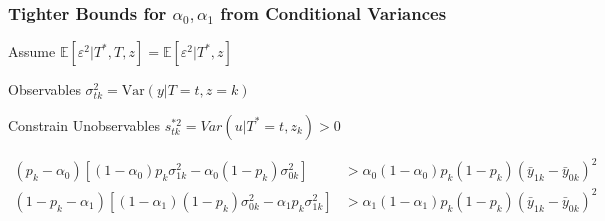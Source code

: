 \documentclass{beamer}
\begin{document}
\begin{frame}
  \frametitle{Tighter Bounds for $\alpha_0, \alpha_1$ from Conditional Variances}
  \begin{block}{Assume}
    $\mathbb{E}[\varepsilon^2|T^*,T,z] = \mathbb{E}[\varepsilon^2|T^*,z]$
  \end{block}

  \begin{block}{Observables}
    $\sigma^2_{tk} = \mbox{Var}(y|T=t,z=k)$ 
  \end{block}

  \begin{block}{Constrain Unobservables}
    $s^{*2}_{tk} = Var(u|T^*=t, z_k) > 0$ 

    \footnotesize
\begin{align*}
  (p_k - \alpha_0) \left[ (1 - \alpha_0)p_k \sigma^2_{1k} - \alpha_0 (1 - p_k)\sigma_{0k}^2 \right] &> \alpha_0 (1 - \alpha_0)p_k (1 - p_k)(\bar{y}_{1k} - \bar{y}_{0k})^2\\
  (1 - p_k - \alpha_1) \left[ (1 - \alpha_1)(1 - p_k) \sigma^2_{0k} - \alpha_1 p_k\sigma_{1k}^2 \right] &> \alpha_1 (1 - \alpha_1)p_k (1 - p_k)(\bar{y}_{1k} - \bar{y}_{0k})^2
\end{align*}
  \end{block}
\end{frame}
\end{document}
